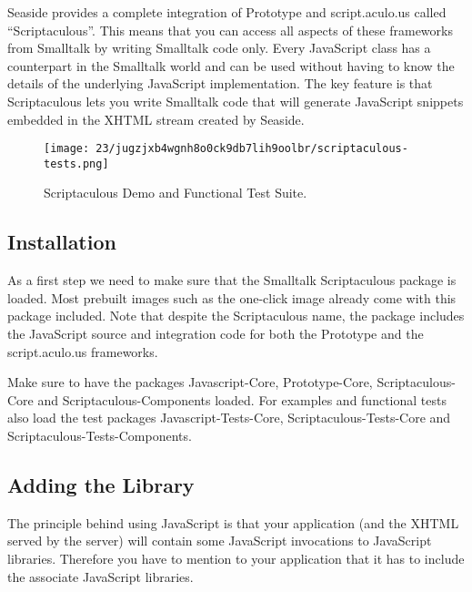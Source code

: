 \documentclass[a4paper,10pt,twoside]{book}
\newcommand{\ct}[1]{{\small\ttfamily\textup{#1}}}
\begin{document}
Seaside provides a complete integration of Prototype and script.aculo.us called ``Scriptaculous''. This means that you can access all aspects of these frameworks from Smalltalk by writing Smalltalk code only. Every JavaScript class has a counterpart in the Smalltalk world and can be used without having to know the details of the underlying JavaScript implementation. The key feature is that Scriptaculous lets you write Smalltalk code that will generate JavaScript snippets embedded in the XHTML stream created by Seaside.

\begin{figure}[h!tbp]
	\begin{center}
		\texttt{[image: 23/jugzjxb4wgnh8o0ck9db7lih9oolbr/scriptaculous-tests.png]}
		\caption{Scriptaculous Demo and Functional Test Suite.\label{book:web20:scriptaculous:frameworks:scriptaculoustests}}
	\end{center}
\end{figure}


\subsection{Installation}
\label{book:web20:scriptaculous:frameworks:installation}

As a first step we need to make sure that the Smalltalk Scriptaculous package is loaded. Most prebuilt images such as the one-click image already come with this package included. Note that despite the Scriptaculous name, the package includes the JavaScript source and integration code for both the Prototype and the script.aculo.us frameworks.  

Make sure to have the packages \ct{Javascript-Core}, \ct{Prototype-Core}, \ct{Scriptaculous-Core} and \ct{Scriptaculous-Components} loaded. For examples and functional tests also load the test packages \ct{Javascript-Tests-Core}, \ct{Scriptaculous-Tests-Core} and \ct{Scriptaculous-Tests-Components}.

\subsection{Adding the Library}
\label{book:web20:scriptaculous:frameworks:library}

The principle behind using JavaScript is that your application (and the XHTML served by the server) will contain some JavaScript invocations to JavaScript libraries. Therefore you have to mention to your application that it has to include the associate JavaScript libraries.
\end{document}
